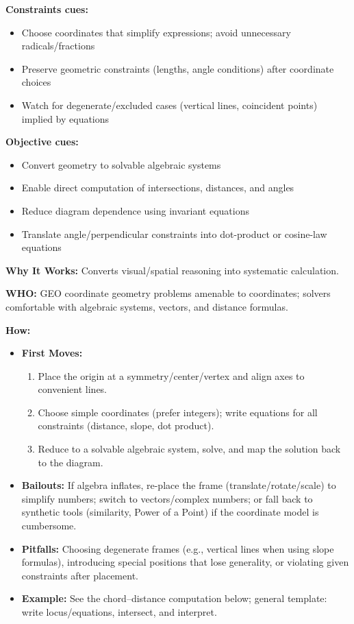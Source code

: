 \documentclass[12pt]{article}
\begin{document}
\textbf{Constraints cues:}
\begin{itemize}
    \item Choose coordinates that simplify expressions; avoid unnecessary radicals/fractions
    \item Preserve geometric constraints (lengths, angle conditions) after coordinate choices
    \item Watch for degenerate/excluded cases (vertical lines, coincident points) implied by equations
\end{itemize}

\textbf{Objective cues:}
\begin{itemize}
    \item Convert geometry to solvable algebraic systems
    \item Enable direct computation of intersections, distances, and angles
    \item Reduce diagram dependence using invariant equations
    \item Translate angle/perpendicular constraints into dot-product or cosine-law equations
\end{itemize}

\textbf{Why It Works:} Converts visual/spatial reasoning into systematic calculation.

\textbf{WHO:} GEO coordinate geometry problems amenable to coordinates; solvers comfortable with algebraic systems, vectors, and distance formulas.


\textbf{How:}
\begin{itemize}
    \item \textbf{First Moves:}
    \begin{enumerate}[nosep]
        \item Place the origin at a symmetry/center/vertex and align axes to convenient lines.
        \item Choose simple coordinates (prefer integers); write equations for all constraints (distance, slope, dot product).
        \item Reduce to a solvable algebraic system, solve, and map the solution back to the diagram.
    \end{enumerate}
    \item \textbf{Bailouts:} If algebra inflates, re-place the frame (translate/rotate/scale) to simplify numbers; switch to vectors/complex numbers; or fall back to synthetic tools (similarity, Power of a Point) if the coordinate model is cumbersome.
    \item \textbf{Pitfalls:} Choosing degenerate frames (e.g., vertical lines when using slope formulas), introducing special positions that lose generality, or violating given constraints after placement.
    \item \textbf{Example:} See the chord–distance computation below; general template: write locus/equations, intersect, and interpret.
\end{itemize}
\end{document}
